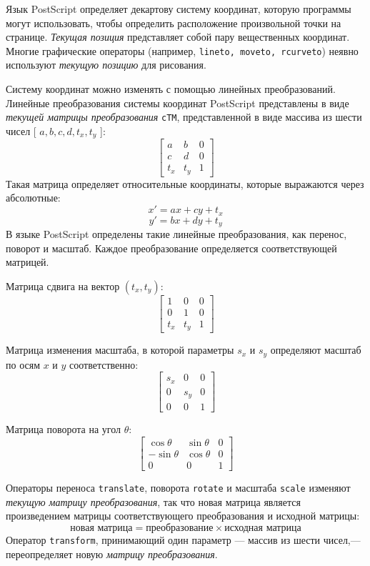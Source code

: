 Язык PostScript определяет декартову систему координат, которую программы могут использовать, чтобы определить расположение произвольной точки на странице.  
\textit{Текущая позиция} представляет собой пару вещественных координат. Многие графические операторы (например, \texttt{lineto, moveto, rcurveto}) неявно используют \textit{текущую позицию} для рисования.

Систему координат можно изменять с помощью линейных преобразований. Линейные преобразования системы координат PostScript представлены в виде \textit{текущей матрицы преобразования} \texttt{cTM}, представленной в виде массива из шести чисел [ $a, b, c, d, t_x, t_y$ ]:
\[
\begin{bmatrix}
a & b & 0 \\ c & d & 0 \\ t_x & t_y & 1
\end{bmatrix}
\]
Такая матрица определяет относительные координаты, которые выражаются через абсолютные:
$$ x' = ax + cy + t_x $$
$$   y' = bx + dy + t_y $$ 
В языке PostScript определены такие линейные преобразования, как перенос, поворот и масштаб. Каждое преобразование определяется соответствующей матрицей. 

Матрица сдвига на вектор $(t_x, t_y)$:
\[
\begin{bmatrix}
1 & 0 & 0 \\ 0 & 1 & 0 \\ t_x & t_y & 1
\end{bmatrix}
\]

Матрица изменения масштаба, в которой параметры $s_x$ и $s_y$ определяют масштаб по осям $x$ и $y$ соответственно:
\[
\begin{bmatrix}
s_x & 0 & 0 \\ 0 & s_y & 0 \\ 0 & 0 & 1
\end{bmatrix}
\]

Матрица поворота на угол $\theta$:
\[
\begin{bmatrix}
\cos \theta & \sin \theta & 0 \\ -\sin \theta & \cos \theta & 0 \\ 0 & 0 & 1
\end{bmatrix}
\]

 Операторы переноса \texttt{translate}, поворота \texttt{rotate} и масштаба \texttt{scale} изменяют \textit{текущую матрицу преобразования}, так что новая матрица является произведением матрицы соответствующего преобразования и исходной матрицы: 
\[ \texttt{новая матрица} = \texttt{преобразование} \times \texttt{исходная матрица} \]
Оператор \texttt{transform}, принимающий один параметр --- массив из шести чисел,--- переопределяет новую \textit{матрицу преобразования}. 

